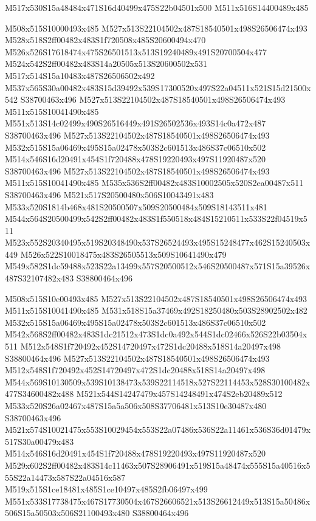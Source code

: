 \documentclass{article}
\begin{document}
\begin{multicols}{2}
\begin{center}
M517x530S15a48484x471S16d40499x475S22b04501x500 M511x516S14400489x485 
\end{center}


M508x515S10000493x485 M527x513S22104502x487S18540501x498S26506474x493 M528x518S2ff00482x483S1f720508x485S20600494x470 M526x526S17618474x475S26501513x513S19240489x491S20700504x477 M524x542S2ff00482x483S14a20505x513S20600502x531 M517x514S15a10483x487S26506502x492 M537x565S30a00482x483S15d39492x539S17300520x497S22a04511x521S15d21500x542 S38700463x496 M527x513S22104502x487S18540501x498S26506474x493 M511x515S10041490x485 M551x513S14c02499x490S26516449x491S26502536x493S14c0a472x487 S38700463x496 M527x513S22104502x487S18540501x498S26506474x493 M532x515S15a06469x495S15a02478x503S2c601513x486S37c06510x502 M514x546S16d20491x454S1f720488x478S19220493x497S11920487x520 S38700463x496 M527x513S22104502x487S18540501x498S26506474x493 M511x515S10041490x485 M535x536S2ff00482x483S10002505x520S2ea00487x511 S38700463x496 M521x517S20500480x506S10043491x483 M533x520S1814b468x481S20500507x509S20500484x509S18143511x481 M544x564S20500499x542S2ff00482x483S1f550518x484S15210511x533S22f04519x511 M523x552S20340495x519S20348490x537S26524493x495S15248477x462S15240503x449 M526x522S10018475x483S26505513x509S10641490x479 M549x582S1dc59488x523S22a13499x557S20500512x546S20500487x571S15a39526x487S32107482x483 S38800464x496

M508x515S10e00493x485 M527x513S22104502x487S18540501x498S26506474x493 M511x515S10041490x485 M531x518S15a37469x492S18250480x503S28902502x482 M532x515S15a06469x495S15a02478x503S2c601513x486S37c06510x502 M542x568S2ff00482x483S1dc21512x473S1dc0a492x544S1dc02466x526S22b03504x511 M512x548S1f720492x452S14720497x472S1dc20488x518S14a20497x498 S38800464x496 M527x513S22104502x487S18540501x498S26506474x493 M512x548S1f720492x452S14720497x472S1dc20488x518S14a20497x498 M544x569S10130509x539S10138473x539S22114518x527S22114453x528S30100482x477S34600482x488 M521x544S14247479x457S14248491x474S2eb20489x512 M533x520S26a02467x487S15a5a506x508S37706481x513S10e30487x480 S38700463x496 M521x574S10021475x553S10029454x553S22a07486x536S22a11461x536S36d01479x517S30a00479x483 M514x546S16d20491x454S1f720488x478S19220493x497S11920487x520 M529x602S2ff00482x483S14c11463x507S28906491x519S15a48474x555S15a40516x555S22a14473x587S22a04516x587 M519x515S1ce18481x485S1ce10497x485S2fb06497x499 M551x533S17738475x467S17730504x467S26606521x513S26612449x513S15a50486x506S15a50503x506S21100493x480 S38800464x496


\end{multicols}
\end{document}
